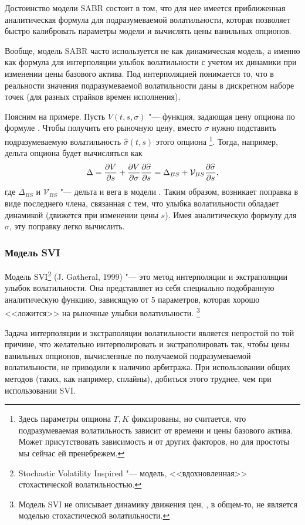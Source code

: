 Достоинство модели SABR состоит в том, что для нее имеется приближенная аналитическая формула для подразумеваемой волатильности, которая  позволяет быстро калибровать параметры модели и вычислять цены ванильных опционов.

Вообще, модель SABR часто используется не как динамическая модель, а именно как формула для интерполяции улыбок волатильности с учетом их динамики при изменении цены базового актива.
Под интерполяцией понимается то, что в реальности значения подразумеваемой волатильности даны в дискретном наборе точек (для разных страйков времен исполнения).

Поясним на примере.
Пусть $V(t,s,\sigma)$ "--- функция, задающая цену опциона по формуле \bs.
Чтобы получить его рыночную цену, вместо $\sigma$ нужно подставить подразумеваемую волатильность $\hat\sigma(t,s)$ этого опциона%
\footnote{Здесь параметры опциона $T,K$ фиксированы, но считается, что подразумеваемая волатильность зависит от времени и цены базового актива.
Может присутствовать зависимость и от других факторов, но для простоты мы сейчас ей пренебрежем.}.
Тогда, например, дельта опциона будет вычисляться как
\[
\Delta = \frac{\partial V}{\partial s} + \frac{\partial V}{\partial \sigma} \frac{\partial \widehat\sigma}{\partial s} = \Delta_{BS} + \mathcal{V}_{BS} \frac{\partial \widehat\sigma}{\partial s},
\]
где $\Delta_{BS}$ и $\mathcal{V}_{BS}$ "--- дельта и вега в модели \bs.
Таким образом, возникает поправка в виде последнего члена, связанная с тем, что улыбка волатильности обладает динамикой (движется при изменении цены $s$).
Имея аналитическую формулу для $\hat\sigma$, эту поправку легко вычислить. 


\subsubsection{Модель SVI}

Модель SVI\footnote{Stochastic Volatility Inspired "--- модель, <<вдохновленная>> стохастической волатильностью.} (J. Gatheral, 1999) "--- это метод интерполяции и экстраполяции улыбок волатильности.
Она представляет из себя специально подобранную аналитическую функцию, зависящую от 5 параметров, которая хорошо <<ложится>> на рыночные улыбки волатильности.%
\footnote{Модель SVI не описывает динамику движения цен, \te, в общем-то, не является моделью стохастической волатильности.}

Задача интерполяции и экстраполяции волатильности является непростой по той причине, что желательно интерполировать и экстраполировать так, чтобы цены ванильных опционов, вычисленные по получаемой подразумеваемой волатильности, не приводили к наличию арбитража. 
При использовании общих методов (таких, как например, сплайны), добиться этого труднее, чем при использовании SVI.


